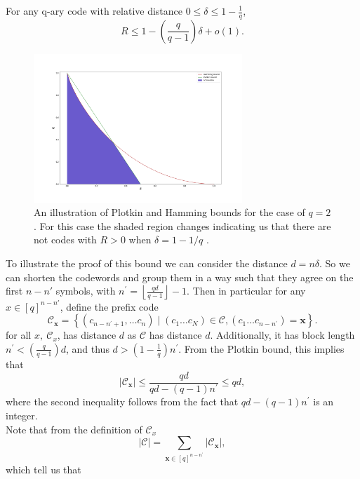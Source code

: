 \begin{definition}
For any q-ary code with relative distance $0 \leq \delta \leq 1-\frac{1}{q}$,
\begin{equation}
R \leq 1-\left(\frac{q}{q-1}\right) \delta+o(1).
\label{CH2:Plotkin_bound}
\end{equation}
\end{definition}

\begin{figure}
\centering
\includegraphics[width=0.7\textwidth]{Figures/Hamming_plotkin_bound.png}
\caption{An illustration of Plotkin and Hamming bounds for the case of $q=2$.  For this case the shaded region changes indicating us that there are not codes with $R>0$ when $\delta=1-1/q$ .}
\end{figure}

To illustrate the proof of this bound we can consider the distance $d=n\delta$. So we can shorten the codewords and group them in a way such that they agree on the first $n-n'$ symbols, with $n^{\prime}=\left\lfloor\frac{q d}{q-1}\right\rfloor-1$. Then in particular for any $x\in [q]^{n-n'}$, define the prefix code
\begin{equation}
\mathcal{C}_{\mathbf{x}}=\left\{\left(c_{n-n^{\prime}+1}, \ldots c_{n}\right) \mid\left(c_{1} \ldots c_{N}\right) \in \mathcal{C},\left(c_{1} \ldots c_{n-n^{\prime}}\right)=\mathbf{x}\right\}.
\end{equation}
for all $x,\ \mathcal{C}_{x}$, has distance $d$ as $\mathcal{C}$ has distance $d$. Additionally, it has block length $n^{\prime}<\left(\frac{q}{q-1}\right) d$, and thus $d>\left(1-\frac{1}{q}\right) n^{\prime}$. From the Plotkin bound, this implies that
\begin{equation}
\left|\mathcal{C}_{\mathbf{x}}\right| \leq \frac{q d}{q d-(q-1) n^{\prime}} \leq q d,
\end{equation}
where the second inequality follows from the fact that $q d-(q-1) n^{\prime}$ is an integer.\\
Note that from the definition of $\mathcal{C}_{x}$
\begin{equation}
|\mathcal{C}|=\sum_{\mathbf{x} \in[q]^{n-n^{\prime}}}\left|\mathcal{C}_{\mathbf{x}}\right|,
\end{equation}
which tell us that 

